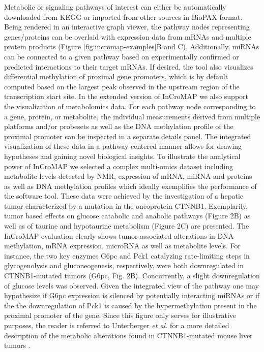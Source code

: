 \documentclass[final,5p,times,twocolumn]{elsarticle}
\newcommand\red[1]{{\color{red}#1}}
\begin{document}
Metabolic or signaling pathways of interest can either be automatically downloaded from KEGG or imported from other sources in BioPAX format. Being rendered in an interactive graph viewer, the pathway nodes representing genes/proteins can be overlaid with expression data from mRNAs and multiple protein products (Figure \ref{fig:incromap-examples}B \red{and C}). Additionally, miRNAs can be connected to a given pathway based on experimentally confirmed or predicted interactions to their target mRNAs. If desired, the tool also visualizes differential methylation of proximal gene promoters, which is by default computed based on the largest peak observed in the upstream region of the transcription start site. In the extended version of InCroMAP we also support the visualization of metabolomics data. For each pathway node corresponding to a gene, protein, or metabolite, the individual measurements derived from multiple platforms and/or probesets as well as the DNA methylation profile of the proximal promoter can be inspected in a separate details panel. The integrated visualization of these data in a pathway-centered manner allows for drawing hypotheses and gaining novel biological insights. \red{To illustrate the analytical power of InCroMAP we selected a complex multi-omics dataset including metabolite levels detected by NMR, expression of mRNA, miRNA and proteins as well as DNA methylation profiles which ideally exemplifies the performance of the software tool. These data were achieved by the investigation of a hepatic tumor characterized by a mutation in the oncoprotein CTNNB1. Exemplarily, tumor based effects on glucose catabolic and anabolic pathways (Figure 2B) as well as of taurine and hypotaurine metabolism (Figure 2C) are presented. The InCroMAP evaluation clearly shows tumor associated alterations in DNA methylation, mRNA expression, microRNA as well as metabolite levels. For instance, the two key enzymes G6pc and Pck1 catalyzing rate-limiting steps in glycogenolysis and gluconeogenesis, respectively, were both downregulated in CTNNB1-mutated tumors (G6pc, Fig. 2B). Concurrently, a slight downregulation of glucose levels was observed. Given the integrated view of the pathway one may hypothesize if G6pc expression is silenced by potentially interacting miRNAs or if the the downregulation of Pck1 is caused by the hypermethylation present in the proximal promoter of the gene.} Since this figure only serves for illustrative purposes, the reader is referred to Unterberger \textit{et al.} for a more detailed description of the metabolic alterations found in CTNNB1-mutated mouse liver tumors \cite{Unterberger2014}.
\end{document}
